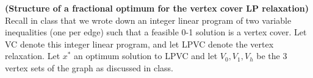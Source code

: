 \documentclass[solution,addpoints,12pt]{exam}
\begin{document}
\begin{questions}
\question[30] \textbf{(Structure of a fractional optimum for the vertex cover LP relaxation)}
Recall in class that we wrote down an integer linear program of two variable inequalities (one per edge) such that a feasible 0-1 solution is a vertex cover.  Let VC denote this integer linear program, and let LPVC denote the vertex relaxation.  Let $x^*$ an optimum solution to LPVC and let $V_0, V_1, V_h$ be the 3 vertex sets of the graph as discussed in class.



\end{questions}
\end{document}
